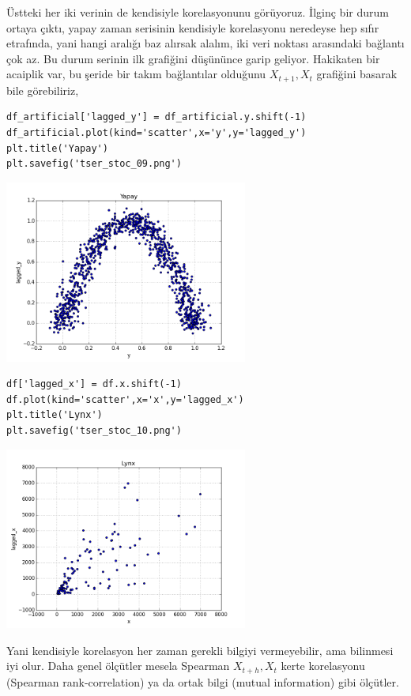 \documentclass[12pt,fleqn]{article}\usepackage{../../common}
\begin{document}
Üstteki her iki verinin de kendisiyle korelasyonunu görüyoruz. İlginç bir durum
ortaya çıktı, yapay zaman serisinin kendisiyle korelasyonu neredeyse hep sıfır
etrafında, yani hangi aralığı baz alırsak alalım, iki veri noktası arasındaki
bağlantı çok az. Bu durum serinin ilk grafiğini düşününce garip
geliyor. Hakikaten bir acaiplik var, bu şeride bir takım bağlantılar olduğunu
$X_{t+1},X_t$ grafiğini basarak bile görebiliriz,

\begin{verbatim}
df_artificial['lagged_y'] = df_artificial.y.shift(-1)
df_artificial.plot(kind='scatter',x='y',y='lagged_y')
plt.title('Yapay')
plt.savefig('tser_stoc_09.png')
\end{verbatim}

\includegraphics[height=6cm]{tser_stoc_09.png}

\begin{verbatim}
df['lagged_x'] = df.x.shift(-1)
df.plot(kind='scatter',x='x',y='lagged_x')
plt.title('Lynx')
plt.savefig('tser_stoc_10.png')
\end{verbatim}

\includegraphics[height=6cm]{tser_stoc_10.png}

Yani kendisiyle korelasyon her zaman gerekli bilgiyi vermeyebilir, ama bilinmesi
iyi olur. Daha genel ölçütler mesela Spearman $X_{t+h},X_t$ kerte korelasyonu
(Spearman rank-correlation) ya da ortak bilgi (mutual information) gibi
ölçütler.
\end{document}
